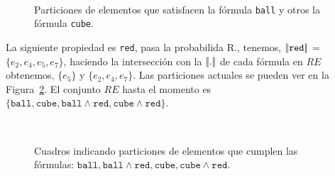 \begin{figure}[h]
\begin{center}
\\[0pt]
\caption{Particiones de elementos que satisfacen la f\'ormula \texttt{ball} y otros la f\'ormula \texttt{cube}.}
\label{fig-modelo4}
\end{center}
\end{figure}

La siguiente propiedad es \texttt{red}, pasa la probabilida R.\randomuse, tenemos,  
$|\!|\texttt{red}|\!|$ = $\{e_2, e_4, e_5, e_7\}$, haciendo la intersecci\'on con la $|\!|.|\!|$ de cada f\'ormula en $RE$ obtenemos, 
$\{e_5\}$ y $\{e_2, e_4, e_7\}$. Las particiones actuales se pueden ver en la Figura~\ref{fig-modelo9}. El conjunto $RE$ hasta el momento es $\{\texttt{ball}, \texttt{cube}, \texttt{ball} \wedge \texttt{red}, \texttt{cube} \wedge \texttt{red}\}$.

\begin{figure}[h]
\begin{center}
\\[0pt]
\caption{Cuadros indicando particiones de elementos que cumplen las f\'ormulas: $\texttt{ball}, \texttt{ball} \wedge \texttt{red}, \texttt{cube},\texttt{cube} \wedge \texttt{red}$.}
\label{fig-modelo9}
\end{center}
\end{figure}    

